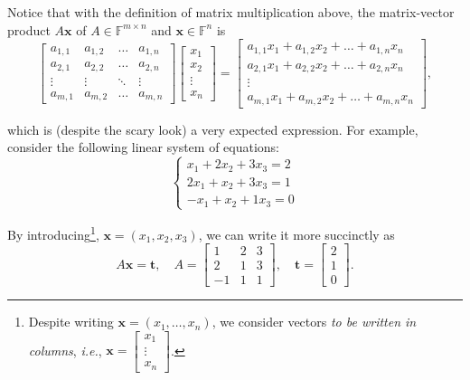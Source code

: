 \documentclass[../../book.tex]{subfiles}
\begin{document}
Notice that with the definition of matrix multiplication above, the matrix-vector product $A\mathbf{x}$ of $A \in \mathbb{F}^{m \times n}$ and $\mathbf{x} \in \mathbb{F}^n$ is
\begin{equation*}
    \begin{bmatrix}
        a_{1,1} & a_{1,2} & \dots & a_{1,n} \\
        a_{2,1} & a_{2,2} & \dots & a_{2,n} \\
        \vdots & \vdots & \ddots & \vdots \\
        a_{m,1} & a_{m,2} & \dots & a_{m,n}
    \end{bmatrix}\begin{bmatrix}
        x_1 \\ x_2 \\ \vdots \\ x_n
    \end{bmatrix} = \begin{bmatrix}
        a_{1,1}x_1 + a_{1,2}x_2 + \dots + a_{1,n}x_n \\
        a_{2,1}x_1 + a_{2,2}x_2 + \dots + a_{2,n}x_n \\
        \vdots \\
        a_{m,1}x_1 + a_{m,2}x_2 + \dots + a_{m,n}x_n
    \end{bmatrix},
\end{equation*}

which is (despite the scary look) a very expected expression.
For example, consider the following linear system of equations:
\begin{equation*}
    \begin{cases}
        x_1 + 2x_2 + 3x_3 = 2 \\
        2x_1 + x_2 + 3x_3 = 1 \\
        -x_1 + x_2 + 1x_3 = 0
    \end{cases}
\end{equation*}

By introducing\footnote{Despite writing $\mathbf{x}=(x_1,\dots,x_n)$, we consider vectors \emph{to be written in columns}, \textit{i.e.}, $\mathbf{x}=\begin{bmatrix}
    x_1 \\ \vdots \\ x_n
\end{bmatrix}$.}, $\mathbf{x}=(x_1,x_2,x_3)$, we can write it more succinctly as
\begin{equation*}
    A\mathbf{x} = \mathbf{t}, \quad A = \begin{bmatrix}
        1 & 2 & 3 \\
        2 & 1 & 3 \\
        -1 & 1 & 1
    \end{bmatrix}, \quad \mathbf{t} = \begin{bmatrix}
        2 \\ 1 \\ 0
    \end{bmatrix}.
\end{equation*}
\end{document}
